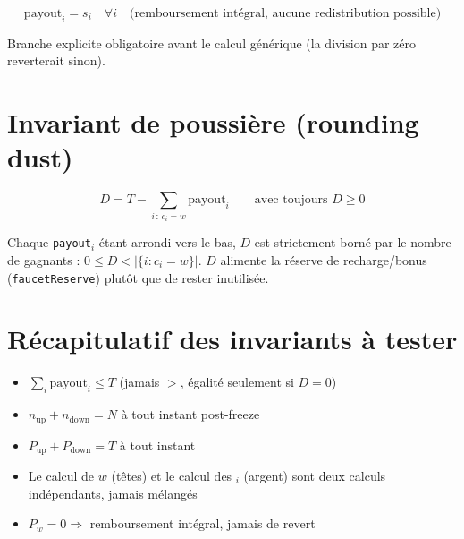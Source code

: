 \documentclass[11pt]{article}
\newcommand{\up}{\text{up}}
\newcommand{\down}{\text{down}}
\begin{document}
\[
\text{payout}_i = s_i \quad \forall i \quad \text{(remboursement intégral, aucune redistribution possible)}
\]

Branche explicite obligatoire avant le calcul générique (la division par zéro reverterait sinon).

\section{Invariant de poussière (rounding dust)}

\[
D = T - \sum_{i \,:\, c_i = w} \text{payout}_i \qquad \text{avec toujours } D \geq 0
\]

Chaque \texttt{payout}$_i$ étant arrondi vers le bas, $D$ est strictement borné par le nombre de gagnants : $0 \leq D < |\{i : c_i = w\}|$. $D$ alimente la réserve de recharge/bonus (\texttt{faucetReserve}) plutôt que de rester inutilisée.

\section{Récapitulatif des invariants à tester}

\begin{itemize}
\item $\sum_i \text{payout}_i \leq T$ (jamais $>$, égalité seulement si $D=0$)
\item $n_\up + n_\down = N$ à tout instant post-freeze
\item $P_\up + P_\down = T$ à tout instant
\item Le calcul de $w$ (têtes) et le calcul des $_i$ (argent) sont deux calculs indépendants, jamais mélangés
\item $P_w = 0 \Rightarrow$ remboursement intégral, jamais de revert
\end{itemize}
\end{document}
